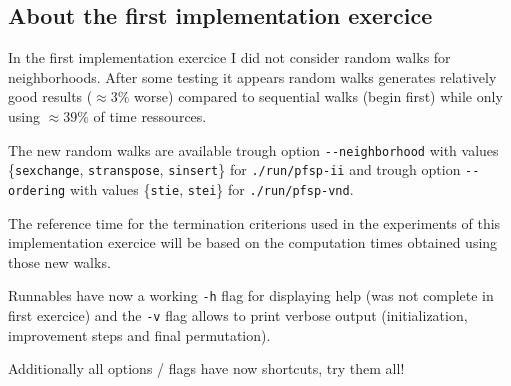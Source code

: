 \subsection{About the first implementation exercice}


In the first implementation exercice I did not consider random walks for neighborhoods. After some testing it appears random walks generates relatively good results ($\approx 3 \%$ worse) compared to sequential walks (begin first) while only using $\approx 39 \%$ of time ressources.

The new random walks are available trough option \verb!--neighborhood! with values
\{\verb!sexchange!, \verb!stranspose!, \verb!sinsert!\}
for \verb!./run/pfsp-ii!
and trough option \verb!--ordering! with values
\{\verb!stie!, \verb!stei!\}
for \verb!./run/pfsp-vnd!.

The reference time for the termination criterions used in the experiments of this implementation exercice will be based on the computation times obtained using those new walks.


Runnables have now a working \verb!-h! flag for displaying help (was not complete in first exercice) and the \verb!-v! flag allows to print verbose output (initialization, improvement steps and final permutation).

Additionally all options / flags have now shortcuts, try them all!